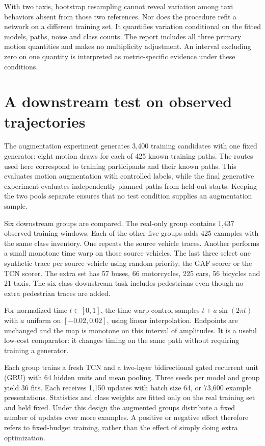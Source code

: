 With two taxis, bootstrap resampling cannot reveal variation among taxi behaviors absent from those two references. Nor does the procedure refit a network on a different training set. It quantifies variation conditional on the fitted models, paths, noise and class counts. The report includes all three primary motion quantities and makes no multiplicity adjustment. An interval excluding zero on one quantity is interpreted as metric-specific evidence under these conditions.

\section{A downstream test on observed trajectories}
The augmentation experiment generates 3,400 training candidates with one fixed generator: eight motion draws for each of 425 known training paths. The routes used here correspond to training participants and their known paths. This evaluates motion augmentation with controlled labels, while the final generative experiment evaluates independently planned paths from held-out starts. Keeping the two pools separate ensures that no test condition supplies an augmentation sample.

Six downstream groups are compared. The real-only group contains 1,437 observed training windows. Each of the other five groups adds 425 examples with the same class inventory. One repeats the source vehicle traces. Another performs a small monotone time warp on those source vehicles. The last three select one synthetic trace per source vehicle using random priority, the GAF scorer or the TCN scorer. The extra set has 57 buses, 66 motorcycles, 225 cars, 56 bicycles and 21 taxis. The six-class downstream task includes pedestrians even though no extra pedestrian traces are added.

For normalized time $t\in[0,1]$, the time-warp control samples $t+a\sin(2\pi t)$ with $a$ uniform on $[-0.02,0.02]$, using linear interpolation. Endpoints are unchanged and the map is monotone on this interval of amplitudes. It is a useful low-cost comparator: it changes timing on the same path without requiring training a generator.

Each group trains a fresh TCN and a two-layer bidirectional gated recurrent unit (GRU) with 64 hidden units and mean pooling. Three seeds per model and group yield 36 fits. Each receives 1,150 updates with batch size 64, or 73,600 example presentations. Statistics and class weights are fitted only on the real training set and held fixed. Under this design the augmented groups distribute a fixed number of updates over more examples. A positive or negative effect therefore refers to fixed-budget training, rather than the effect of simply doing extra optimization.

